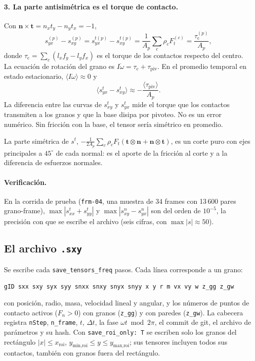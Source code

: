 \documentclass[11pt,a4paper]{article}
\newcommand{\vect}[1]{\mathbf{#1}}
\newcommand{\n}{\vect{n}}
\newcommand{\tv}{\vect{t}}
\newcommand{\code}[1]{\texttt{#1}}
\newcommand{\ave}[1]{\langle #1 \rangle}
\begin{document}
\paragraph{3. La parte antisimétrica es el torque de contacto.}
\label{sec:antisim}
Con $\n \times \tv = n_x t_y - n_y t_x = -1$,
\begin{equation}
  s^{(p)}_{yx} - s^{(p)}_{xy} = s^{t(p)}_{yx} - s^{t(p)}_{xy}
  = \frac{1}{A_p} \sum_c \rho_c F^{(c)}_t
  = \frac{\tau^{(p)}_\text{c}}{A_p} ,
  \label{eq:torque}
\end{equation}
donde $\tau_\text{c} = \sum_c (l_x f_y - l_y f_x)$ es el torque de los
contactos respecto del centro. La ecuación de rotación del grano es
$I \dot\omega = \tau_\text{c} + \tau_\text{piv}$. En el promedio temporal
en estado estacionario, $\ave{I\dot\omega} \approx 0$ y
\begin{equation}
  \ave{s^t_{yx} - s^t_{xy}} \approx -\frac{\ave{\tau_\text{piv}}}{A_p} .
\end{equation}
La diferencia entre las curvas de $s^t_{xy}$ y $s^t_{yx}$ mide el torque
que los contactos transmiten a los granos y que la base disipa por
pivoteo. No es un error numérico. Sin fricción con la base, el tensor
sería simétrico en promedio.

La parte simétrica de $s^t$,
$-\frac{1}{2A_p} \sum_c \rho_c F_t (\tv \otimes \n + \n \otimes \tv)$, es
un corte puro con ejes principales a $45^\circ$ de cada normal: es el
aporte de la fricción al corte y a la diferencia de esfuerzos normales.

\paragraph{Verificación.} En la corrida de prueba (\code{frm-04}, una muestra de
34 frames con 13\,600 pares grano-frame), $\max|s^t_{xx} + s^t_{yy}|$ y $\max|s^n_{xy} -
s^n_{yx}|$ son del orden de $10^{-5}$, la precisión con que se escribe el
archivo (seis cifras, con $\max|s| \approx 50$).

\subsection{El archivo \code{.sxy}}

Se escribe cada \code{save\_tensors\_freq} pasos. Cada línea corresponde a
un grano:
\begin{center}
  \code{gID sxx sxy syx syy snxx snxy snyx snyy x y r m vx vy w z\_gg z\_gw}
\end{center}
con posición, radio, masa, velocidad lineal y angular, y los números de
puntos de contacto activos ($F_n > 0$) con granos (\code{z\_gg}) y con
paredes (\code{z\_gw}). La cabecera registra \code{nStep}, \code{n\_frame},
$t$, $\Delta t$, la fase $\omega t \bmod 2\pi$, el commit de git, el
archivo de parámetros y su hash. Con \code{save\_roi\_only: T} se escriben
solo los granos del rectángulo $|x| \le x_\text{roi}$,
$y_\text{min,roi} \le y \le y_\text{max,roi}$; sus tensores incluyen
todos sus contactos, también con granos fuera del rectángulo.
\end{document}
